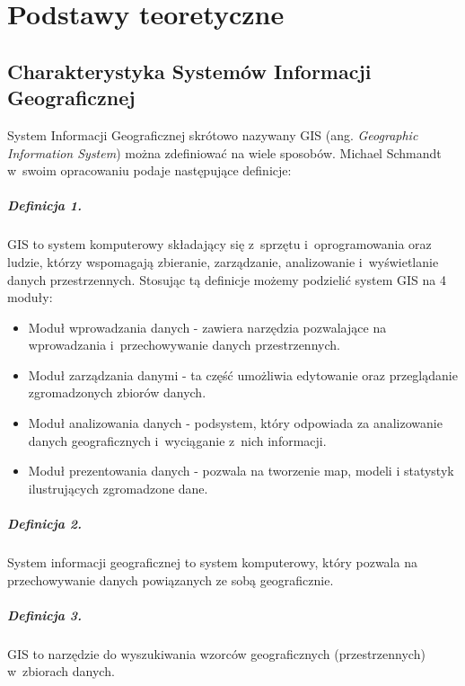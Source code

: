 \documentclass[printmode]{mgr}
\begin{document}
\chapter{Podstawy teoretyczne}

\section{Charakterystyka Systemów Informacji Geograficznej}
System Informacji Geograficznej skrótowo nazywany GIS (ang. \textit{Geographic Information System}) można zdefiniować na wiele sposobów. Michael Schmandt w~swoim opracowaniu \cite{gis_introduction} podaje następujące definicje:

\paragraph*{Definicja 1.}
GIS to system komputerowy składający się z~sprzętu i~oprogramowania oraz ludzie, którzy wspomagają zbieranie, zarządzanie, analizowanie i~wyświetlanie danych przestrzennych. Stosując tą definicje możemy podzielić system GIS na 4 moduły:

  \begin{itemize}
    \item Moduł wprowadzania danych - zawiera narzędzia pozwalające na wprowadzania i~przechowywanie danych przestrzennych.
    \item Moduł zarządzania danymi - ta część umożliwia edytowanie oraz przeglądanie zgromadzonych zbiorów danych.
    \item Moduł analizowania danych - podsystem, który odpowiada za analizowanie danych geograficznych i~wyciąganie z~nich informacji.
    \item Moduł prezentowania danych - pozwala na tworzenie map, modeli i statystyk ilustrujących zgromadzone dane.
  \end{itemize}

\paragraph*{Definicja 2.}
System informacji geograficznej to system komputerowy, który pozwala na przechowywanie danych powiązanych ze sobą geograficznie.

\paragraph*{Definicja 3.}
GIS to narzędzie do wyszukiwania wzorców geograficznych (przestrzennych) w~zbiorach danych.
\end{document}
